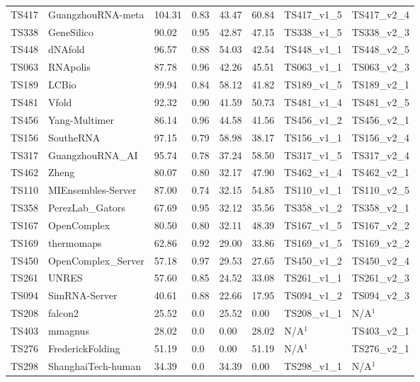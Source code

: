 \begin{table}[ht]
{\begin{tabular}{llllllll}
TS417 & GuangzhouRNA-meta & 104.31 & 0.83 & 43.47 & 60.84 & TS417\_v1\_5 & TS417\_v2\_4 \\ 
TS338 & GeneSilico & 90.02 & 0.95 & 42.87 & 47.15 & TS338\_v1\_5 & TS338\_v2\_3 \\ 
TS448 & dNAfold & 96.57 & 0.88 & 54.03 & 42.54 & TS448\_v1\_1 & TS448\_v2\_5 \\ 
TS063 & RNApolis & 87.78 & 0.96 & 42.26 & 45.51 & TS063\_v1\_1 & TS063\_v2\_3 \\ 
TS189 & LCBio & 99.94 & 0.84 & 58.12 & 41.82 & TS189\_v1\_5 & TS189\_v2\_1 \\ 
TS481 & Vfold & 92.32 & 0.90 & 41.59 & 50.73 & TS481\_v1\_4 & TS481\_v2\_5 \\ 
TS456 & Yang-Multimer & 86.14 & 0.96 & 44.58 & 41.56 & TS456\_v1\_2 & TS456\_v2\_1 \\ 
TS156 & SoutheRNA & 97.15 & 0.79 & 58.98 & 38.17 & TS156\_v1\_1 & TS156\_v2\_4 \\ 
TS317 & GuangzhouRNA\_AI & 95.74 & 0.78 & 37.24 & 58.50 & TS317\_v1\_5 & TS317\_v2\_4 \\ 
TS462 & Zheng & 80.07 & 0.80 & 32.17 & 47.90 & TS462\_v1\_4 & TS462\_v2\_1 \\ 
TS110 & MIEnsembles-Server & 87.00 & 0.74 & 32.15 & 54.85 & TS110\_v1\_1 & TS110\_v2\_5 \\ 
TS358 & PerezLab\_Gators & 67.69 & 0.95 & 32.12 & 35.56 & TS358\_v1\_2 & TS358\_v2\_1 \\ 
TS167 & OpenComplex & 80.50 & 0.80 & 32.11 & 48.39 & TS167\_v1\_5 & TS167\_v2\_2 \\ 
TS169 & thermomaps & 62.86 & 0.92 & 29.00 & 33.86 & TS169\_v1\_5 & TS169\_v2\_2 \\ 
TS450 & OpenComplex\_Server & 57.18 & 0.97 & 29.53 & 27.65 & TS450\_v1\_2 & TS450\_v2\_4 \\ 
TS261 & UNRES & 57.60 & 0.85 & 24.52 & 33.08 & TS261\_v1\_1 & TS261\_v2\_3 \\ 
TS094 & SimRNA-Server & 40.61 & 0.88 & 22.66 & 17.95 & TS094\_v1\_2 & TS094\_v2\_3 \\ 
TS208 & falcon2 & 25.52 & 0.0 & 25.52 & 0.00 & TS208\_v1\_1 & N/A$^{1}$ \\ 
TS403 & mmagnus & 28.02 & 0.0 & 0.00 & 28.02 & N/A$^{1}$ & TS403\_v2\_1 \\ 
TS276 & FrederickFolding & 51.19 & 0.0 & 0.00 & 51.19 & N/A$^{1}$ & TS276\_v2\_1 \\ 
TS298 & ShanghaiTech-human & 34.39 & 0.0 & 34.39 & 0.00 & TS298\_v1\_1 & N/A$^{1}$ \\ 

\end{tabular}}
\end{table}
